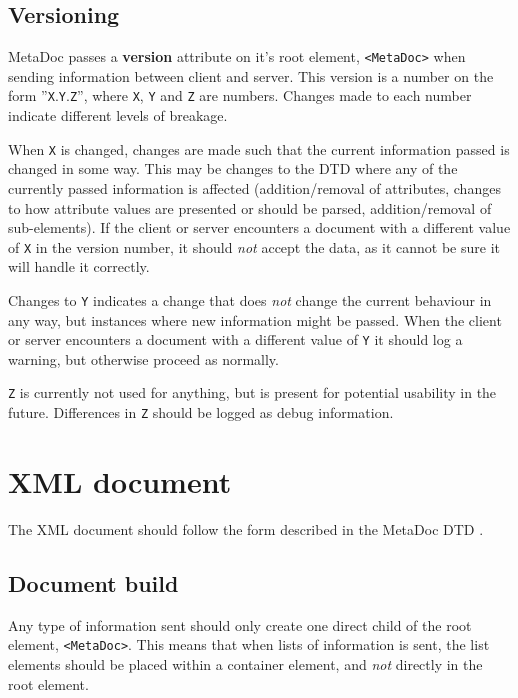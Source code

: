 \documentclass[titlepage, a4paper,10pt]{article}
\begin{document}
\subsection{Versioning}
MetaDoc passes a \textbf{version} attribute on it's root element,
\texttt{<MetaDoc>} when sending information between client and server. This
version is a number on the form ''\texttt{X}.\texttt{Y}.\texttt{Z}'', where
\texttt{X}, \texttt{Y} and \texttt{Z} are numbers. Changes made to each number 
indicate different levels of breakage. 

When \texttt{X} is changed, changes are made such that the current information
passed is changed in some way. This may be changes to the DTD where any of the
currently passed information is affected (addition/removal of attributes,
changes to how attribute values are presented or should be parsed,
addition/removal of sub-elements). If the client or server encounters a
document with a different value of \texttt{X} in the version number, it should
\textit{not} accept the data, as it cannot be sure it will handle it correctly.

Changes to \texttt{Y} indicates a change that does \textit{not} change the
current behaviour in any way, but instances where new information might be
passed. When the client or server encounters a document with a different value
of \texttt{Y} it should log a warning, but otherwise proceed as normally.

\texttt{Z} is currently not used for anything, but is present for potential
usability in the future. Differences in \texttt{Z} should be logged as debug
information.

\newpage
\section{XML document}
\label{sec:xmldoc}

The XML document should follow the form described in the MetaDoc DTD 
\cite{metadoc_dtd}. 

\subsection{Document build}

Any type of information sent should only create one direct child of the root
element, \texttt{<MetaDoc>}. This means that when lists of information is sent, 
the list elements should be placed within a container element, and \textit{not} 
directly in the root element.
\end{document}

